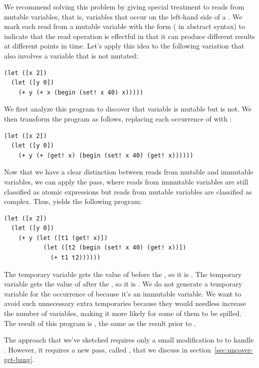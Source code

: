 \documentclass[7x10]{TimesAPriori_MIT}%
\numberwithin{theorem}{chapter}
\numberwithin{definition}{chapter}
\numberwithin{equation}{chapter}
\begin{document}
{We recommend solving this problem by giving special treatment to reads
from mutable variables, that is, variables that occur on the left-hand
side of a . We mark each read from a mutable variable with
the form  ( in abstract syntax) to indicate
that the read operation is effectful in that it can produce different
results at different points in time. Let's apply this idea to the
following variation that also involves a variable that is not mutated:
\begin{lstlisting}
(let ([x 2])
  (let ([y 0])
    (+ y (+ x (begin (set! x 40) x)))))
\end{lstlisting}
We first analyze this program to discover that variable 
is mutable but  is not. We then transform the program as
follows, replacing each occurrence of  with :
\begin{lstlisting}
(let ([x 2])
  (let ([y 0])
    (+ y (+ (get! x) (begin (set! x 40) (get! x))))))
\end{lstlisting}
Now that we have a clear distinction between reads from mutable and
immutable variables, we can apply the 
pass, where reads from immutable variables are still classified as
atomic expressions but reads from mutable variables are classified as
complex.  Thus,  yields the following
program:\\
\begin{minipage}{\textwidth}
\begin{lstlisting}
(let ([x 2])
  (let ([y 0])
    (+ y (let ([t1 (get! x)])
           (let ([t2 (begin (set! x 40) (get! x))])
             (+ t1 t2))))))
\end{lstlisting}
\end{minipage}
The temporary variable  gets the value of  before the
, so it is .  The temporary variable  gets
the value of  after the , so it is .  We
do not generate a temporary variable for the occurrence of 
because it's an immutable variable. We want to avoid such unnecessary
extra temporaries because they would needless increase the number of
variables, making it more likely for some of them to be spilled.  The
result of this program is , the same as the result prior to
.

The approach that we've sketched requires only a small
modification to  to handle
. However, it requires a new pass, called
, that we discuss in
section~\ref{sec:uncover-get-bang}.

}
\end{document}
